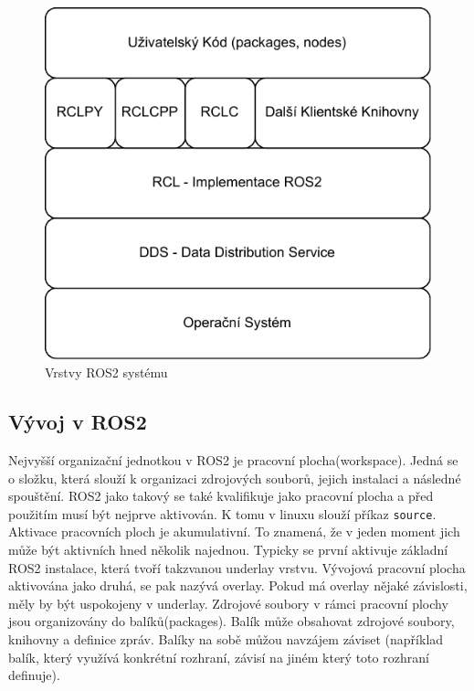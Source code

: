 \begin{figure}[h!]
	\centering
	\includegraphics[scale=0.75]{obrazky-figures/ros_layers.pdf}
	\caption{Vrstvy ROS2 systému}
	\label{fig:ros_layers}
\end{figure}

\subsection*{Vývoj v ROS2}
Nejvyšší organizační jednotkou v ROS2 je pracovní plocha(workspace). Jedná se o složku, která slouží k organizaci zdrojových souborů, jejich instalaci a následné spouštění. ROS2 jako takový se také kvalifikuje jako pracovní plocha a před použitím musí být nejprve aktivován. K tomu v linuxu slouží příkaz \verb|source|. Aktivace pracovních ploch je akumulativní. To znamená, že v jeden moment jich může být aktivních hned několik najednou. Typicky se první aktivuje základní ROS2 instalace, která tvoří takzvanou underlay vrstvu. Vývojová pracovní plocha aktivována jako druhá, se pak nazývá overlay. Pokud má overlay nějaké závislosti, měly by být uspokojeny v underlay.
Zdrojové soubory v rámci pracovní plochy jsou organizovány do balíků(packages). Balík může obsahovat zdrojové soubory, knihovny a definice zpráv. Balíky na sobě můžou navzájem záviset (například balík, který využívá konkrétní rozhraní, závisí na jiném který toto rozhraní definuje). \cite[str:~10-11]{ros2_introduction} 

